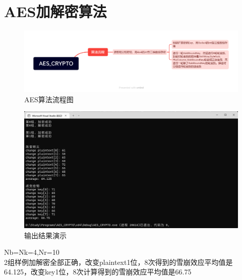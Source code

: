 \section{AES加解密算法}
\begin{figure}[thbp!]
	\centering
	\includegraphics[height=6 CM,width=18cm]{figure/001.png}
	\caption{AES算法流程图}
	\label{fig:AES算法流程图}
\end{figure}
\begin{figure}[thbp!]
	\centering
	\includegraphics[height=10 CM]{figure/002}
	\caption{输出结果演示}
	\label{fig:输出结果演示}
\end{figure}
Nb=Nk=4,Nr=10\\
2组样例加解密全部正确，改变plaintext1位，8次得到的雪崩效应平均值是64.125，改变key1位，8次计算得到的雪崩效应平均值是66.75\\

